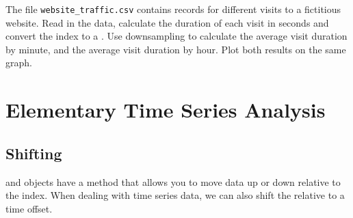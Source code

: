 \begin{problem} %
The file \texttt{website\_traffic.csv} contains records for different visits to a fictitious website.
Read in the data, calculate the duration of each visit in seconds and convert the index to a .
Use downsampling to calculate the average visit duration by minute, and the average visit duration by hour.
Plot both results on the same graph.
\end{problem}

\section*{Elementary Time Series Analysis} %

\subsection*{Shifting}

 and  objects have a  method that allows you to move data up or down relative to the index.
When dealing with time series data, we can also shift the  relative to a time offset.

